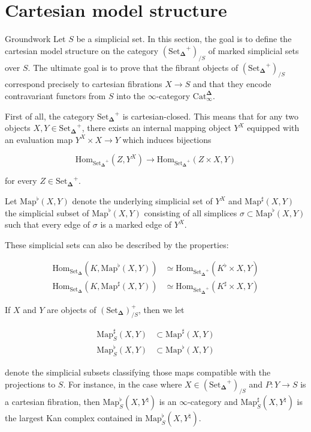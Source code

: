 \documentclass{beamer}[9pt]
\newcommand{\8}{\ensuremath{\infty}}
\newcommand{\SSet}{\ensuremath{\text{Set}_{\boldsymbol{\Delta}}}}
\newcommand{\Catinfdel}{\ensuremath{\text{Cat}^{\boldsymbol{\Delta}}_{\infty}}}
\newcommand{\Map}{\ensuremath{\text{Map}}}
\newcommand{\Hom}{\ensuremath{\text{Hom}}}
\begin{document}
\section{Cartesian model structure}

\begin{frame}{Groundwork}
  Let $S$ be a simplicial set. In this section, the goal is to define the cartesian model structure on the category $(\SSet^+)_{/S}$ of marked simplicial sets over $S$. The ultimate goal is to prove that the fibrant objects of $(\SSet^+)_{/S}$ correspond precisely to cartesian fibrations $X \rightarrow S$ and that they encode contravariant functors from $S$ into the \8-category \Catinfdel.
\end{frame}

\begin{frame}
  First of all, the category $\SSet^+$ is cartesian-closed. This means that for any two objects $X, Y\in \SSet^+$, there exists an internal mapping object $Y^X$ equipped with an evaluation map $Y^X\times X \rightarrow Y$ which induces bijections

  $$
    \Hom_{\SSet^+}(Z, Y^X) \rightarrow \Hom_{\SSet^+}(Z\times X, Y)
  $$

  for every $Z \in \SSet^+$.

  \pause

  Let $\Map^\flat(X, Y)$ denote the underlying simplicial set of $Y^X$ and $\Map^\sharp(X, Y)$ the simplicial subset of $\Map^\flat(X, Y)$ consisting of all simplices $\sigma\subset \Map^\flat(X, Y)$ such that every edge of $\sigma$ is a marked edge of $Y^X$.
\end{frame}

\begin{frame}
  These simplicial sets can also be described by the properties:

  \begin{align*}
    \Hom_{\SSet}(K, \Map^\flat(X, Y))  & \simeq \Hom_{\SSet^+}(K^\flat\times X, Y)  \\
    \Hom_{\SSet}(K, \Map^\sharp(X, Y)) & \simeq \Hom_{\SSet^+}(K^\sharp\times X, Y)
  \end{align*}

  \pause

  If $X$ and $Y$ are objects of $(\SSet)^+_{/S}$, then we let

  \begin{align*}
    \Map_S^\sharp(X, Y) & \subset \Map^\sharp(X, Y) \\
    \Map_S^\flat(X, Y)  & \subset \Map^\flat(X, Y)
  \end{align*}

  denote the simplicial subsets classifying those maps compatible with the projections to $S$. For instance, in the case where $X \in (\SSet^+)_{/S}$ and $P: Y \rightarrow S$ is a cartesian fibration, then $\Map^\flat_S(X, Y^\natural)$ is an \8-category and $\Map^\sharp_S(X, Y^\natural)$ is the largest Kan complex contained in $\Map^\flat_S(X, Y^\natural)$.
\end{frame}
\end{document}
